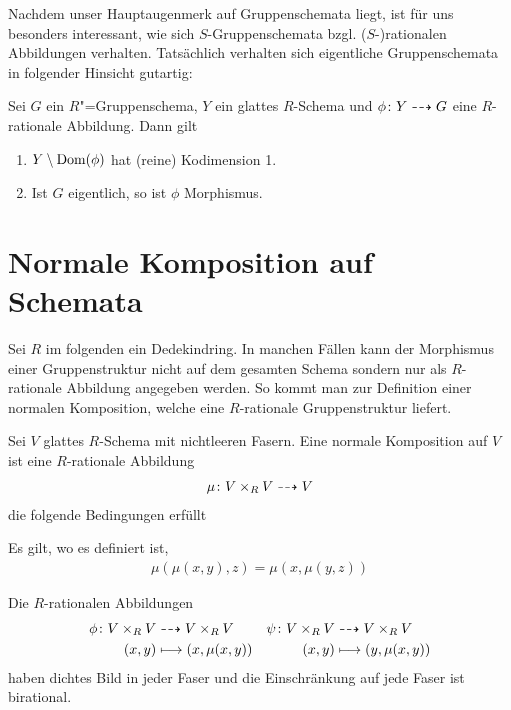 Nachdem unser Hauptaugenmerk auf Gruppenschemata liegt, ist für uns
besonders interessant, wie sich $S$-Gruppenschemata
bzgl. ($S$-)rationalen Abbildungen verhalten.
Tatsächlich verhalten sich eigentliche Gruppenschemata in folgender
Hinsicht gutartig:
\begin{Lemma}
  \label{thm:rationalzumorphismus}
  Sei $G$ ein $R$"=Gruppenschema, $Y$ ein glattes $R$-Schema und
  $\phi\colon Y\dashrightarrow G$ eine $R$-rationale Abbildung.
  Dann gilt
  \begin{enumerate}[label=(\roman*)]
  \item $Y\setminus \operatorname{Dom}(\phi)$ hat (reine) Kodimension 1.
  \item Ist $G$ eigentlich, so ist $\phi$ Morphismus.
  \end{enumerate}
\end{Lemma}


\section{Normale Komposition auf Schemata}
Sei $R$ im folgenden ein Dedekindring.
In manchen Fällen kann der Morphismus einer Gruppenstruktur nicht auf
dem gesamten Schema sondern nur als $R$-rationale Abbildung angegeben
werden. So kommt man zur Definition einer normalen Komposition, welche
eine $R$-rationale Gruppenstruktur liefert.
\begin{Definition}\label{def:normalekomposition}
  Sei $V$ glattes $R$-Schema mit nichtleeren Fasern.
  Eine normale Komposition auf $V$ ist eine $R$-rationale
  Abbildung
  \begin{gather*}
    \mu\colon V\times_R V\dashrightarrow V
  \end{gather*}
  die folgende Bedingungen erfüllt
  \begin{description}[font=\normalfont\itshape]
  \item[(Assoziativität)] Es gilt, wo es definiert ist,
    \begin{gather*}
      \mu(\mu(x,y),z)=\mu(x,\mu(y,z))
    \end{gather*}
  \item[(Inverses)]
    Die $R$-rationalen Abbildungen
    \begin{align*}
      \phi\colon V\times_R V
      &\dashrightarrow V\times_R V
      &\psi\colon V\times_R V
      & \dashrightarrow V\times_R V\\
      (x,y)
      &\longmapsto (x,\mu(x,y))
      &(x,y)
      &\longmapsto (y,\mu(x,y))       
    \end{align*}
    haben dichtes Bild in jeder Faser und die Einschränkung auf jede
    Faser ist birational.
  \end{description}
\end{Definition}

